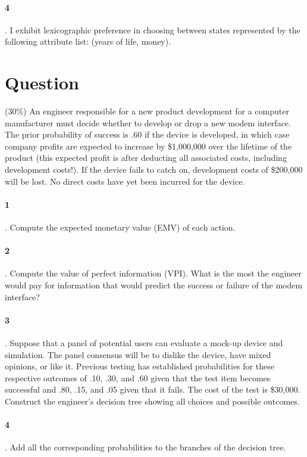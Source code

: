 \documentclass[10pt]{article}
\begin{document}
   \paragraph{4}. I exhibit lexicographic preference in choosing between states represented by the following attribute list: (years of life, money).

\section{Question}
 (30\%) An engineer responsible for a new product development for a computer manufacturer must decide whether to develop or drop a new modem interface. The prior probability of success is .60 if the device is developed, in which case company profits are expected to increase by \$1,000,000 over the lifetime of the product (this expected profit is after deducting all associated costs, including development costs!). If the device fails to catch on, development costs of \$200,000 will be lost. No direct costs have yet been incurred for the device.

   \paragraph{1}. Compute the expected monetary value (EMV) of each action.

   \paragraph{2}. Compute the value of perfect information (VPI). What is the most the engineer would pay for information that would predict the success or failure of the modem interface?

   \paragraph{3}. Suppose that a panel of potential users can evaluate a mock-up device and simulation. The panel consensus will be to dislike the device, have mixed opinions, or like it. Previous testing has established probabilities for these respective outcomes of .10, .30, and .60 given that the test item becomes successful and .80, .15, and .05 given that it fails. The cost of the test is \$30,000. Construct the engineer's decision tree showing all choices and possible outcomes.

   \paragraph{4}. Add all the corresponding probabilities to the branches of the decision tree.
\end{document}
